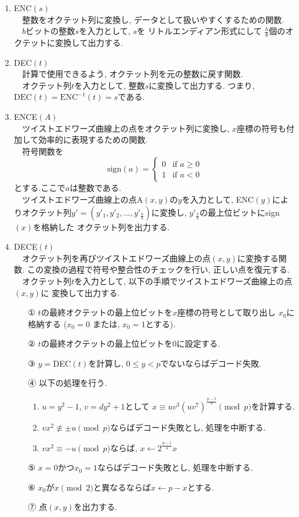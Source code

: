 \begin{enumerate}
  \item ENC$(s)$\\
  　整数をオクテット列に変換し, データとして扱いやすくするための関数.\\
  　$b$ビットの整数$s$を入力として, $s$を リトルエンディアン形式にして
  $\tfrac{b}{8}$個のオクテットに変換して出力する. 
  \item DEC$(t)$\\
  　計算で使用できるよう, オクテット列を元の整数に戻す関数.\\
  　オクテット列$t$を入力として, 整数$s$に変換して出力する.
  つまり, $\mathrm{DEC}(t)=\mathrm{ENC}^{-1}(t)=s$である.
  \item ENCE$(A)$\\
  　ツイストエドワーズ曲線上の点をオクテット列に変換し, 
  $x$座標の符号も付加して効率的に表現するための関数.\\
  　符号関数を
  \[
    \text{sign}(a) =
    \begin{cases}
    0 & \text{if } a \geq 0 \\
    1 & \text{if } a < 0
    \end{cases}
  \]
  とする.ここで$a$は整数である.\\
  　ツイストエドワーズ曲線上の点A$(x,y)$の$y$を入力として, 
  ENC$(y)$によりオクテット列$y'=(y'_1,y'_2,...,y'_\frac{b}{8})$に変換し, 
  $y'_\frac{b}{8}$の最上位ビットにsign$(x)$を格納した
  オクテット列を出力する.
  \item DECE$(t)$\\
  　オクテット列を再びツイストエドワーズ曲線上の点$(x, y)$に変換する関数.
  この変換の過程で符号や整合性のチェックを行い, 正しい点を復元する.\\
  　オクテット列$t$を入力として, 以下の手順でツイストエドワーズ曲線上の点$(x,y)$に
  変換して出力する.
  \begin{enumerate}
    \item[①　] $t$の最終オクテットの最上位ビットを$x$座標の符号として取り出し
    $x_0$に格納する ($x_0=0$ または, $x_0=1$とする). 
    \item[②　] $t$の最終オクテットの最上位ビットを0に設定する.
    \item[③　] $y=$DEC$(t)$を計算し, $0\leq y<p$でないならばデコード失敗.
    \item[④　] 以下の処理を行う.
    \begin{enumerate}
      \item $u=y^2-1$, $v=dy^2+1$として
      $x\equiv uv^3(uv^7)^{\tfrac{p-5}{8}}\pmod p$を計算する.
      \item $vx^2 \not\equiv \pm  u \pmod p$ならばデコード失敗とし, 処理を中断する.
      \item $vx^2\equiv -u \pmod p$ならば, $x\leftarrow 2^{\tfrac{p-1}{4}}x$
    \end{enumerate}
    \item[⑤　] $x=0$かつ$x_0=1$ならばデコード失敗とし, 処理を中断する.
    \item[⑥　] $x_0$が$x \pmod 2$と異なるならば$x\leftarrow p-x$とする.
    \item[⑦　] 点$(x,y)$を出力する.
  \end{enumerate}
\end{enumerate}

